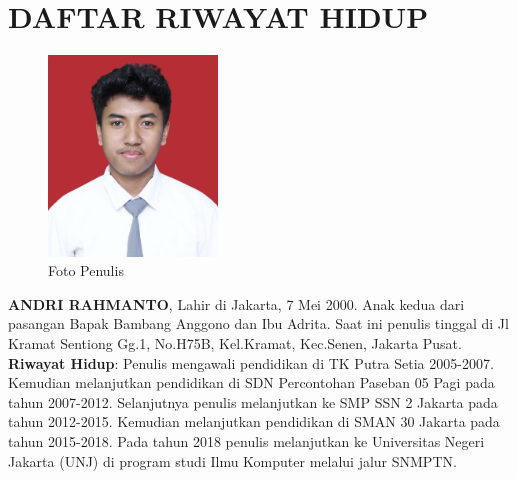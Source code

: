 \chapter {DAFTAR RIWAYAT HIDUP}
\begin{figure}[H]
	\centering
	\includegraphics[width=0.4\textwidth]{gambar/bio-andri}
	\caption{Foto Penulis}
	\label{fig:bio-andri}
\end{figure}
\begin{flushleft}
\textbf{ANDRI RAHMANTO}, Lahir di Jakarta, 7 Mei 2000. Anak kedua dari pasangan Bapak Bambang Anggono dan Ibu Adrita. Saat ini penulis tinggal di Jl Kramat Sentiong Gg.1, No.H75B, Kel.Kramat, Kec.Senen, Jakarta Pusat.
\linebreak
\textbf{Riwayat Hidup}: Penulis mengawali pendidikan di TK Putra Setia 2005-2007. Kemudian melanjutkan pendidikan di SDN Percontohan Paseban 05 Pagi pada tahun 2007-2012. Selanjutnya penulis melanjutkan ke SMP SSN 2 Jakarta pada tahun 2012-2015. Kemudian melanjutkan pendidikan di SMAN 30 Jakarta pada tahun 2015-2018. Pada tahun 2018 penulis melanjutkan ke Universitas Negeri Jakarta (UNJ) di program studi Ilmu Komputer melalui jalur SNMPTN.
\end{flushleft}